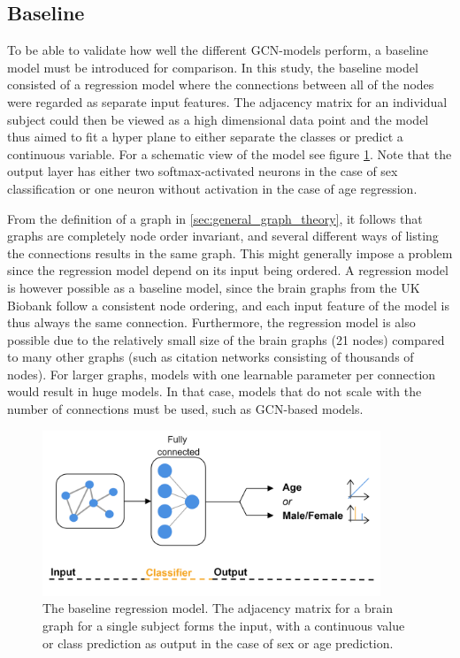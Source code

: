 \subsection{Baseline}
To be able to validate how well the different GCN-models perform, a baseline model must be introduced for comparison. In this study, the baseline model consisted of a regression model where the connections between all of the nodes were regarded as separate input features. The adjacency matrix for an individual subject could then be viewed as a high dimensional data point and the model thus aimed to fit a hyper plane to either separate the classes or predict a continuous variable. For a schematic view of the model see figure \ref{fig:Graph_class_baseline}. Note that the output layer has either two softmax-activated neurons in the case of sex classification or one neuron without activation in the case of age regression. 

From the definition of a graph in \ref{sec:general_graph_theory}, it follows that graphs are completely node order invariant, and several different ways of listing the connections results in the same graph. This might generally impose a problem since the regression model depend on its input being ordered. A regression model is however possible as a baseline model, since the brain graphs from the UK Biobank follow a consistent node ordering, and each input feature of the model is thus always the same connection. Furthermore, the regression model is also possible due to the relatively small size of the brain graphs (21 nodes) compared to many other graphs (such as citation networks consisting of thousands of nodes). For larger graphs, models with one learnable parameter per connection would result in huge models. In that case, models that do not scale with the number of connections must be used, such as GCN-based models. 

%         

\begin{figure}[H]
    \centering
    \includegraphics[width=0.9\textwidth]{chapters/images_methods/ffnn_v2.png}
    \caption{The baseline regression model. The adjacency matrix for a brain graph for a single subject forms the input, with a continuous value or class prediction as output in the case of sex or age prediction.}
    \label{fig:Graph_class_baseline}
\end{figure}

